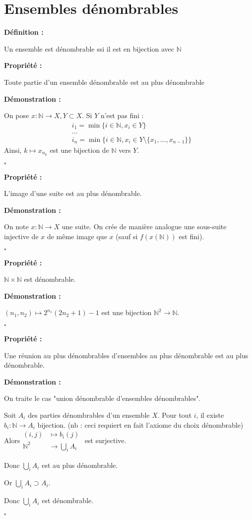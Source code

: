 \documentclass[10pt,a4paper,notitlepage ]{article}
\newenvironment{definition}{
	
	\textbf{Définition : }
}
{}
\newenvironment{propriete}{
	\begin{tcolorbox}
		\textbf{Propriété : }
}
{\end{tcolorbox}}
\newenvironment{demo}{

	\textbf{Démonstration :}
}{\begin{flushright}
	$\square$
\end{flushright}
}
\begin{document}
\part*{Ensembles dénombrables}

\begin{definition}
	Un ensemble est dénombrable ssi il est en bijection avec $\mathbb N$
\end{definition}
\begin{propriete}
	Toute partie d'un ensemble dénombrable est au plus dénombrable
\end{propriete}
\begin{demo}
	On pose $x : \mathbb N \rightarrow X, Y \subset X$. Si $Y$ n'est pas fini :
	\begin{align*}
	&i_1 = \min \{i\in\mathbb N, x_i \in Y \} \\
	&\dots  \\
 	&i_n = \min \{ i\in \mathbb N, x_i\in Y \setminus\{x_1, \dots,x_{n-1}\}\}
 	\end{align*} 
	Ainsi, $k \mapsto x_{n_k}$ est une bijection de $\mathbb N$ vers $Y$.
\end{demo}

\begin{propriete}
	L'image d'une suite est au plus dénombrable.
\end{propriete}
\begin{demo}
	On note $x:\mathbb N \rightarrow X$ une suite.
On crée de manière analogue une sous-suite injective de $x$ de même image que $x$ (sauf si $f(x(\mathbb N))$ est fini).
\end{demo}
\begin{propriete}
	$\mathbb N \times \mathbb N$ est dénombrable.
\end{propriete}
\begin{demo}
	$(n_1,n_2) \mapsto 2^{n_1} (2n_2+1) -1$ est une bijection $\mathbb N^2 \rightarrow \mathbb N$.
\end{demo}

\begin{propriete}
	Une réunion au plus dénombrables d'ensembles au plus dénombrable est au plus dénombrable.
\end{propriete}

\begin{demo}
	On traite le cas "union dénombrable d'ensembles dénombrables".
	
	Soit $A_i$ des parties dénombrables d'un ensemble $X$.
	Pour tout $i$, il existe $b_i : \mathbb N \rightarrow A_i$ bijection. (nb : ceci requiert en fait l'axiome du choix dénombrable)
	Alors$ \begin{aligned}
		(i,j) &\mapsto b_i(j) \\
		\mathbb N ^2 & \rightarrow \underset{i}{\bigcup} A_i
	\end{aligned}$ est surjective.

Donc $\underset{i}{\bigcup}A_i$ est au plus dénombrable.

Or $\underset{i}{\bigcup}A_i \supset A_i$.

Donc $\underset{i}{\bigcup} A_i$ est dénombrable.
\end{demo}
\end{document}
